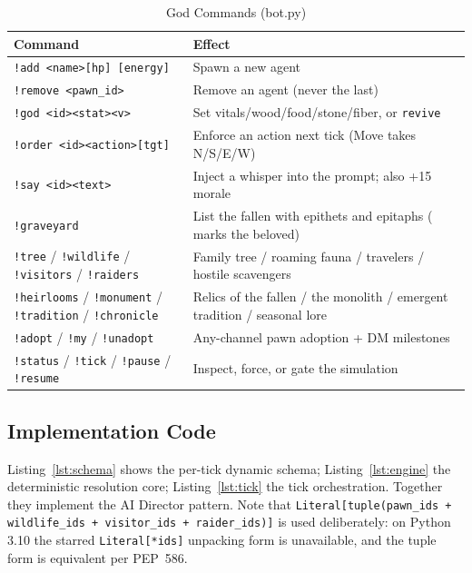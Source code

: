 \documentclass[10pt,a4paper]{article}
\begin{document}
\begin{table}[htbp]
\centering
\caption{God Commands (bot.py)}
\label{tab:god}
\begin{tabular}{@{}ll@{}}
\toprule
\textbf{Command} & \textbf{Effect} \\
\midrule
\texttt{!add \textless name\textgreater [hp] [energy]} & Spawn a new agent \\
\texttt{!remove \textless pawn\_id\textgreater}         & Remove an agent (never the last) \\
\texttt{!god \textless id\textgreater \textless stat\textgreater \textless v\textgreater}       & Set vitals/wood/food/stone/fiber, or \texttt{revive} \\
\texttt{!order \textless id\textgreater \textless action\textgreater [tgt]} & Enforce an action next tick (Move takes N/S/E/W) \\
\texttt{!say \textless id\textgreater \textless text\textgreater}           & Inject a whisper into the prompt; also +15 morale \\
\texttt{!graveyard} & List the fallen with epithets and epitaphs (💖 marks the beloved) \\
\texttt{!tree} / \texttt{!wildlife} / \texttt{!visitors} / \texttt{!raiders} & Family tree / roaming fauna / travelers / hostile scavengers \\
\texttt{!heirlooms} / \texttt{!monument} / \texttt{!tradition} / \texttt{!chronicle} & Relics of the fallen / the monolith / emergent tradition / seasonal lore \\
\texttt{!adopt} / \texttt{!my} / \texttt{!unadopt} & Any-channel pawn adoption + DM milestones \\
\texttt{!status} / \texttt{!tick} / \texttt{!pause} / \texttt{!resume} & Inspect, force, or gate the simulation \\
\bottomrule
\end{tabular}
\end{table}

\subsection{Implementation Code}
Listing~\ref{lst:schema} shows the per-tick dynamic schema; Listing~\ref{lst:engine} the deterministic resolution core; Listing~\ref{lst:tick} the tick orchestration. Together they implement the AI Director pattern. Note that \texttt{Literal[tuple(pawn\_ids + wildlife\_ids + visitor\_ids + raider\_ids)]} is used deliberately: on Python 3.10 the starred \texttt{Literal[*ids]} unpacking form is unavailable, and the tuple form is equivalent per PEP~586.
\end{document}
